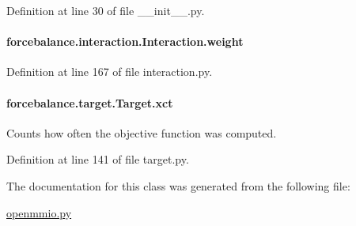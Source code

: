 Definition at line 30 of file \-\_\-\-\_\-init\-\_\-\-\_\-.\-py.

\hypertarget{classforcebalance_1_1interaction_1_1Interaction_a68a6e43e48ec75f375fb987e177126a9}{
\paragraph[{weight}]{\setlength{\rightskip}{0pt plus 5cm}forcebalance.\-interaction.\-Interaction.\-weight\hspace{0.3cm}{\ttfamily [inherited]}}}\label{classforcebalance_1_1interaction_1_1Interaction_a68a6e43e48ec75f375fb987e177126a9}


Definition at line 167 of file interaction.\-py.

\hypertarget{classforcebalance_1_1target_1_1Target_aad2e385cfbf7b4a68f1c2cb41133fe82}{
\paragraph[{xct}]{\setlength{\rightskip}{0pt plus 5cm}forcebalance.\-target.\-Target.\-xct\hspace{0.3cm}{\ttfamily [inherited]}}}\label{classforcebalance_1_1target_1_1Target_aad2e385cfbf7b4a68f1c2cb41133fe82}


Counts how often the objective function was computed. 



Definition at line 141 of file target.\-py.



The documentation for this class was generated from the following file\-:\begin{DoxyCompactItemize}
\item 
\hyperlink{openmmio_8py}{openmmio.\-py}\end{DoxyCompactItemize}
